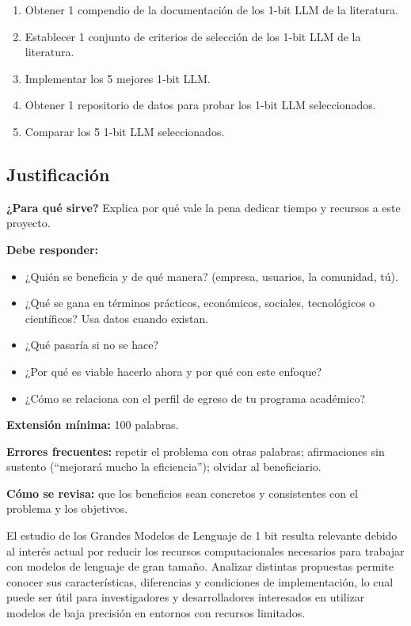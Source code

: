 \begin{enumerate}
    \item Obtener 1 compendio de la documentación de los 1-bit LLM de la literatura.
    \item Establecer 1 conjunto de criterios de selección de los 1-bit LLM de la literatura.
    \item Implementar los 5 mejores 1-bit LLM.
    \item Obtener 1 repositorio de datos para probar los 1-bit LLM seleccionados.
    \item Comparar los 5 1-bit LLM seleccionados.
\end{enumerate}

\subsection{Justificación} \label{sec:justificacion} %

\begin{guia}
\textbf{¿Para qué sirve?} Explica por qué vale la pena dedicar tiempo y recursos a este proyecto.

\textbf{Debe responder:}
\begin{itemize}[nosep,leftmargin=*]
  \item ¿Quién se beneficia y de qué manera? (empresa, usuarios, la comunidad, tú).
  \item ¿Qué se gana en términos prácticos, económicos, sociales, tecnológicos o científicos? Usa datos cuando existan.
  \item ¿Qué pasaría si no se hace?
  \item ¿Por qué es viable hacerlo ahora y por qué con este enfoque?
  \item ¿Cómo se relaciona con el perfil de egreso de tu programa académico?
\end{itemize}

\textbf{Extensión mínima:} 100 palabras.

\textbf{Errores frecuentes:} repetir el problema con otras palabras; afirmaciones sin sustento (``mejorará mucho la
eficiencia''); olvidar al beneficiario.

\textbf{Cómo se revisa:} que los beneficios sean concretos y consistentes con el problema y los objetivos.
\end{guia}


El estudio de los Grandes Modelos de Lenguaje de 1 bit resulta relevante debido al interés actual por reducir los recursos computacionales necesarios para trabajar con modelos de lenguaje de gran tamaño. Analizar distintas propuestas permite conocer sus características, diferencias y condiciones de implementación, lo cual puede ser útil para investigadores y desarrolladores interesados en utilizar modelos de baja precisión en entornos con recursos limitados.

